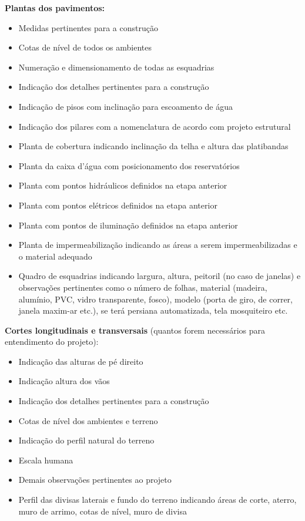 \documentclass[11pt,a4paper]{article}
\begin{document}
\vspace{0.2cm}
\noindent\textbf{Plantas dos pavimentos:}
\begin{itemize}
    \item Medidas pertinentes para a construção
    \item Cotas de nível de todos os ambientes
    \item Numeração e dimensionamento de todas as esquadrias
    \item Indicação dos detalhes pertinentes para a construção
    \item Indicação de pisos com inclinação para escoamento de água
    \item Indicação dos pilares com a nomenclatura de acordo com projeto estrutural
    \item Planta de cobertura indicando inclinação da telha e altura das platibandas
    \item Planta da caixa d'água com posicionamento dos reservatórios
    \item Planta com pontos hidráulicos definidos na etapa anterior
    \item Planta com pontos elétricos definidos na etapa anterior
    \item Planta com pontos de iluminação definidos na etapa anterior
    \item Planta de impermeabilização indicando as áreas a serem impermeabilizadas e o material adequado
    \item Quadro de esquadrias indicando largura, altura, peitoril (no caso de janelas) e observações pertinentes como o número de folhas, material (madeira, alumínio, PVC, vidro transparente, fosco), modelo (porta de giro, de correr, janela maxim-ar etc.), se terá persiana automatizada, tela mosquiteiro etc.
\end{itemize}

\vspace{0.2cm}
\noindent\textbf{Cortes longitudinais e transversais} (quantos forem necessários para entendimento do projeto):
\begin{itemize}
    \item Indicação das alturas de pé direito
    \item Indicação altura dos vãos
    \item Indicação dos detalhes pertinentes para a construção
    \item Cotas de nível dos ambientes e terreno
    \item Indicação do perfil natural do terreno
    \item Escala humana
    \item Demais observações pertinentes ao projeto
    \item Perfil das divisas laterais e fundo do terreno indicando áreas de corte, aterro, muro de arrimo, cotas de nível, muro de divisa
\end{itemize}
\end{document}
